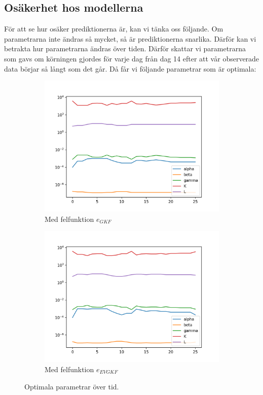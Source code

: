 \documentclass[a4paper, 12pt]{article}
\theoremstyle{definition}
\begin{document}
\subsection{Osäkerhet hos modellerna}
För att se hur osäker prediktionerna är, kan vi tänka oss följande. Om parametrarna inte ändras så mycket, så är prediktionerna snarlika. Därför kan vi betrakta hur parametrarna ändras över tiden. Därför skattar vi parametrarna som gavs om körningen gjordes för varje dag från dag 14 efter att vår observerade data börjar så långt som det går. Då får vi följande parametrar som är optimala:
\begin{figure}[H]
\centering
\begin{subfigure}[b]{.49\textwidth}
\centering
\includegraphics[width=.9\hsize]{bilder/parametrar_over_tid_20200417_gkf.png}
\caption{Med felfunktion $e_{GKF}$}
\end{subfigure}
\begin{subfigure}[b]{.49\textwidth}
\centering
\includegraphics[width=.9\hsize]{bilder/parametrar_over_tid_20200417_evgkf.png}
\caption{Med felfunktion $e_{EVGKF}$}
\end{subfigure}
\caption{Optimala parametrar över tid.}\label{Fig: Parametrar över tid}
\end{figure}
\end{document}
